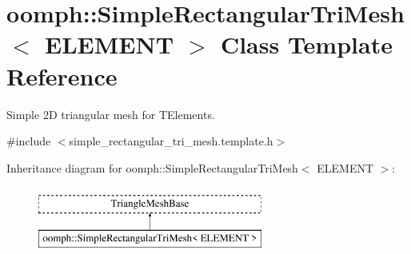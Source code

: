 \hypertarget{classoomph_1_1SimpleRectangularTriMesh}{}\section{oomph\+:\+:Simple\+Rectangular\+Tri\+Mesh$<$ E\+L\+E\+M\+E\+NT $>$ Class Template Reference}
\label{classoomph_1_1SimpleRectangularTriMesh}


Simple 2D triangular mesh for T\+Elements.  




{\ttfamily \#include $<$simple\+\_\+rectangular\+\_\+tri\+\_\+mesh.\+template.\+h$>$}

Inheritance diagram for oomph\+:\+:Simple\+Rectangular\+Tri\+Mesh$<$ E\+L\+E\+M\+E\+NT $>$\+:\begin{figure}[H]
\begin{center}
\leavevmode
\includegraphics[height=2.000000cm]{classoomph_1_1SimpleRectangularTriMesh}
\end{center}
\end{figure}
